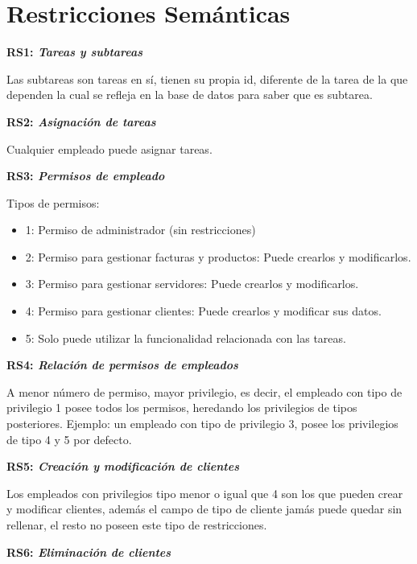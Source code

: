 \documentclass[paper=a4, fontsize=11pt, spanish]{scrartcl}
\begin{document}
\section{Restricciones Semánticas}
\setlength{\parindent}{0em}
\textbf{RS1: \textit{Tareas y subtareas}}
\setlength{\parindent}{2em}

Las subtareas son tareas en sí, tienen su propia id, diferente de la tarea de la que dependen la cual se refleja en la base de datos para saber que es subtarea.

\setlength{\parindent}{0em}
\textbf{RS2: \textit{Asignación de tareas}}
\setlength{\parindent}{2em}

Cualquier empleado puede asignar tareas.

\setlength{\parindent}{0em}
\textbf{RS3: \textit{Permisos de empleado}}
\setlength{\parindent}{2em}

Tipos de permisos:
\begin{itemize}
\item 1: Permiso de administrador (sin restricciones)
\item 2: Permiso para gestionar facturas y productos: Puede crearlos y modificarlos.
\item 3: Permiso para gestionar servidores: Puede crearlos y modificarlos.
\item 4: Permiso para gestionar clientes: Puede crearlos y modificar sus datos.
\item 5: Solo puede utilizar la funcionalidad relacionada con las tareas.
\end{itemize}

\setlength{\parindent}{0em}
\textbf{RS4: \textit{Relación de permisos de empleados}}
\setlength{\parindent}{2em}

A menor número de permiso, mayor privilegio, es decir, el empleado con tipo de privilegio 1 posee todos los permisos, heredando los privilegios de tipos posteriores.
Ejemplo: un empleado con tipo de privilegio 3, posee los privilegios de tipo 4 y 5 por defecto.

\setlength{\parindent}{0em}
\textbf{RS5: \textit{Creación y modificación de clientes}}
\setlength{\parindent}{2em}

Los empleados con privilegios tipo menor o igual que 4 son los que pueden crear y modificar clientes, además el campo de tipo de cliente jamás puede quedar sin rellenar, el resto no poseen este tipo de restricciones.


\setlength{\parindent}{0em}
\textbf{RS6: \textit{Eliminación de clientes}}
\setlength{\parindent}{2em}
\end{document}
